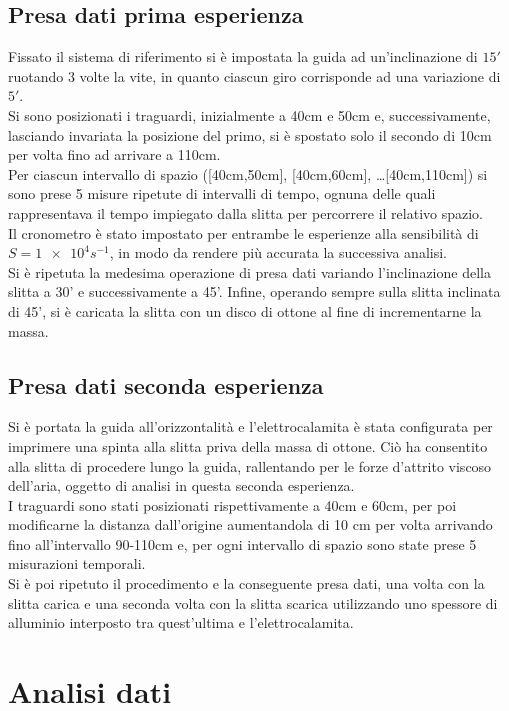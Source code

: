 \documentclass[a4paper,11pt,oneside]{article}
\begin{document}
\subsection{Presa dati prima esperienza}
Fissato il sistema di riferimento si è impostata la guida ad un'inclinazione di $15'$ ruotando 3 volte la vite, in quanto ciascun giro corrisponde ad una variazione  di $5'$.\\

Si sono posizionati i traguardi, inizialmente a 40cm e 50cm e, successivamente, lasciando invariata la posizione del primo, si è spostato solo il secondo di 10cm per volta fino ad arrivare a 110cm. \\
Per ciascun intervallo di spazio ([40cm,50cm], [40cm,60cm], \dots [40cm,110cm]) si sono prese 5 misure ripetute di intervalli di tempo, ognuna delle quali rappresentava il tempo impiegato dalla slitta per percorrere il relativo spazio.\\  
Il cronometro è stato impostato per entrambe le esperienze alla sensibilità di $S=\num{1e4} \si{s^{-1}}$, in modo da rendere più accurata la successiva analisi.\\
Si è ripetuta la medesima operazione di presa dati variando l'inclinazione della slitta a 30' e successivamente a 45'.
Infine, operando sempre sulla slitta inclinata di 45', si è caricata la slitta con un disco di ottone al fine di incrementarne la massa.

\subsection{Presa dati seconda esperienza}
Si è portata la guida all'orizzontalità e l'elettrocalamita è stata configurata per imprimere una spinta alla slitta priva della massa di ottone. Ciò ha consentito alla slitta di procedere lungo la guida, rallentando per le forze d'attrito viscoso dell'aria, oggetto di analisi in questa seconda esperienza.\\
I traguardi sono stati posizionati rispettivamente a 40cm e 60cm, per poi modificarne la distanza dall'origine aumentandola di 10 cm per volta arrivando fino all'intervallo 90-110cm e, per ogni intervallo di spazio sono state prese 5 misurazioni temporali.\\
Si è poi ripetuto il procedimento e la conseguente presa dati, una volta con la slitta carica e una seconda volta con la slitta scarica utilizzando uno spessore di alluminio interposto tra quest'ultima e l'elettrocalamita.

\section{Analisi dati}
\end{document}
